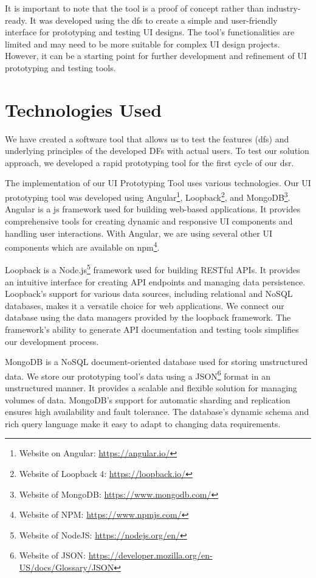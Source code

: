 It is important to note that the tool is a proof of concept rather than industry-ready. 
It was developed using the \ac{df}s to create a simple and user-friendly interface for prototyping and testing UI designs. 
The tool's functionalities are limited and may need to be more suitable for complex UI design projects. 
However, it can be a starting point for further development and refinement of UI prototyping and testing tools.

\clearpage
\section{Technologies Used}
\label{implementation:section:technologies}
We have created a software tool that allows us to test the features (\ac{df}s) and underlying principles of the developed DFs with actual users.
To test our solution approach, we developed a rapid prototyping tool for the first cycle of our \ac{dsr}. 

The implementation of our UI Prototyping Tool uses various technologies.
Our UI prototyping tool was developed using Angular\footnote{Website on Angular: \url{https://angular.io/}}, Loopback\footnote{Website of Loopback 4: \url{https://loopback.io/}}, and MongoDB\footnote{Website of MongoDB: \url{https://www.mongodb.com/}}.
Angular is a \ac{js} framework used for building web-based applications.
It provides comprehensive tools for creating dynamic and responsive UI components and handling user interactions.
With Angular, we are using several other UI components which are available on \ac{npm}\footnote{Website of NPM: \url{https://www.npmjs.com/}}.

Loopback is a Node.js\footnote{Website of NodeJS: \url{https://nodejs.org/en/}} framework used for building RESTful APIs. 
It provides an intuitive interface for creating API endpoints and managing data persistence. 
Loopback's support for various data sources, including relational and NoSQL databases, makes it a versatile choice for web applications. 
We connect our database using the data managers provided by the loopback framework.
The framework's ability to generate API documentation and testing tools simplifies our development process.

MongoDB is a NoSQL document-oriented database used for storing unstructured data. 
We store our prototyping tool's data using a JSON\footnote{Website of JSON: \url{https://developer.mozilla.org/en-US/docs/Glossary/JSON}} format in an unstructured manner.
It provides a scalable and flexible solution for managing volumes of data. 
MongoDB's support for automatic sharding and replication ensures high availability and fault tolerance. 
The database's dynamic schema and rich query language make it easy to adapt to changing data requirements.

